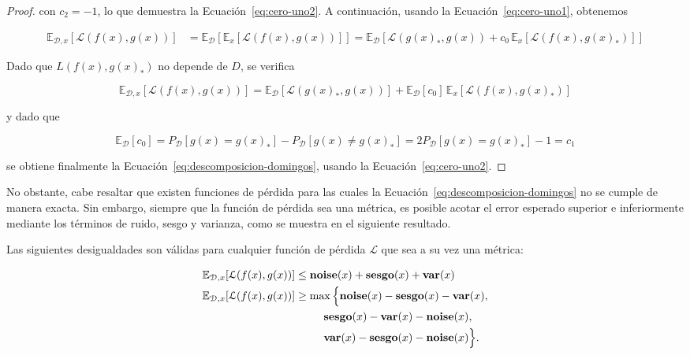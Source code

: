 \begin{proof}
    con $c_2 = -1$, lo que demuestra la Ecuación~\eqref{eq:cero-uno2}. A continuación, usando la Ecuación~\eqref{eq:cero-uno1}, obtenemos

    \begin{align}
        \mathbb{E}_{\mathcal{D}, x}[\mathcal{L}(f(x), g(x))] &= \mathbb{E}_\mathcal{D}[\mathbb{E}_{x}[\mathcal{L}(f(x), g(x))]] = \mathbb{E}_\mathcal{D}[\mathcal{L}(g(x)_*, g(x)) + c_0 \, \mathbb{E}_{x}[\mathcal{L}(f(x), g(x)_*)]]
    \end{align}

    Dado que $L(f(x), g(x)_*)$ no depende de $D$, se verifica

    \begin{equation}
        \mathbb{E}_{\mathcal{D}, x}[\mathcal{L}(f(x), g(x))] = \mathbb{E}_\mathcal{D}[\mathcal{L}(g(x)_*, g(x))] + \mathbb{E}_\mathcal{D}[c_0] \, \mathbb{E}_{x}[\mathcal{L}(f(x), g(x)_*)] 
    \end{equation}

    y dado que

    \begin{equation}
        \mathbb{E}_\mathcal{D}[c_0] = P_\mathcal{D}[g(x) = g(x)_*] - P_\mathcal{D}[g(x) \neq g(x)_*] = 2P_\mathcal{D}[g(x) = g(x)_*] - 1 = c_1
    \end{equation}

    se obtiene finalmente la Ecuación~\eqref{eq:descomposicion-domingos}, usando la Ecuación~\eqref{eq:cero-uno2}.\newline
\end{proof}

No obstante, cabe resaltar que existen funciones de pérdida para las cuales la Ecuación~\eqref{eq:descomposicion-domingos} no se cumple de manera exacta. Sin embargo, siempre que la función de pérdida sea una métrica, es posible acotar el error esperado superior e inferiormente mediante los términos de ruido, sesgo y varianza, como se muestra en el siguiente resultado.

\begin{teorema}
    Las siguientes desigualdades son válidas para cualquier función de pérdida $\mathcal{L}$ que sea a su vez una métrica:

    \begin{align}
        \mathbb{E}_{\mathcal{D}, x}[\mathcal{L}(f(x), g(x))] 
        &\leq \textbf{noise}(x) + \textbf{sesgo}(x) + \textbf{var}(x) \\
        \mathbb{E}_{\mathcal{D}, x}[\mathcal{L}(f(x), g(x))] 
        &\geq \max\Big\{
            \textbf{noise}(x) - \textbf{sesgo}(x) - \textbf{var}(x), \notag \\
            &\hspace{2.6em}
            \textbf{sesgo}(x) - \textbf{var}(x) - \textbf{noise}(x), \notag \\
            &\hspace{2.6em}
            \textbf{var}(x) - \textbf{sesgo}(x) - \textbf{noise}(x)
        \Big\}.
    \end{align}
\end{teorema}


